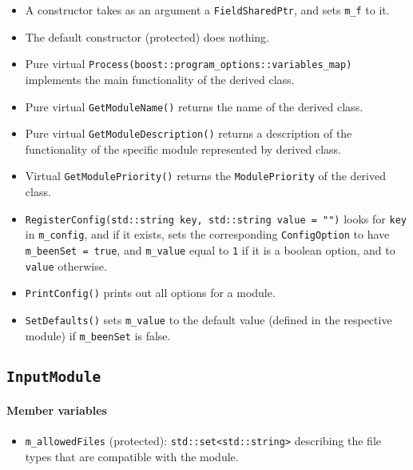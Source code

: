 \begin{itemize}

\item A constructor takes as an argument a \verb+FieldSharedPtr+, and sets \verb+m_f+ to it.

\item The default constructor (protected) does nothing.

\item Pure virtual \verb+Process(boost::program_options::variables_map)+ implements the main functionality of the derived class.

\item Pure virtual \verb+GetModuleName()+ returns the name of the derived class.

\item Pure virtual \verb+GetModuleDescription()+ returns a description of the functionality of the specific module represented by derived class.

\item Virtual \verb+GetModulePriority()+ returns the \verb+ModulePriority+ of the derived class.

\item \verb+RegisterConfig(std::string key, std::string value = "")+ looks for \verb+key+ in \verb+m_config+, and if it exists, sets the corresponding \verb+ConfigOption+ to have \verb+m_beenSet = true+, and \verb+m_value+ equal to \verb+1+ if it is a boolean option, and to \verb+value+ otherwise.

\item \verb+PrintConfig()+ prints out all options for a module.

\item  \verb+SetDefaults()+ sets \verb+m_value+ to the default value (defined in the respective module) if \verb+m_beenSet+ is false.


\end{itemize}


\subsection{\texttt{InputModule}}

\paragraph{Member variables}

\begin{itemize}

\item \verb+m_allowedFiles+ (protected): \verb+std::set<std::string>+ describing the file types that are compatible with the module.

\end{itemize}

